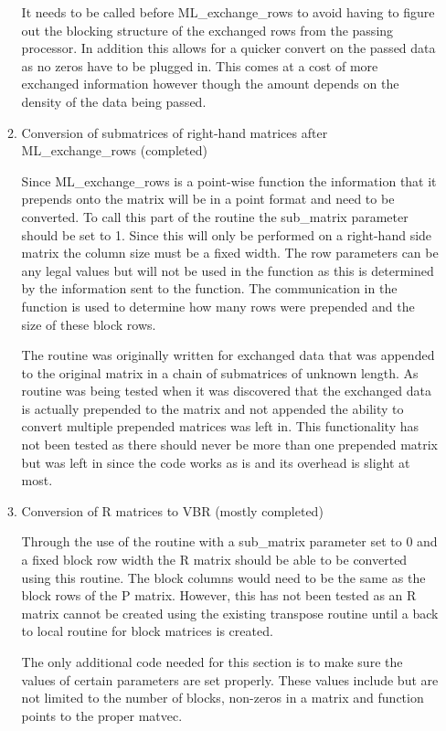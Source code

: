 \documentclass[10pt,letter,relax]{SANDreport}
\begin{document}
\begin{enumerate}
\begin{enumerate}
It needs to be called before ML\_exchange\_rows to avoid having to figure out the blocking structure of the exchanged rows from the passing processor.  In addition this allows for a quicker convert on the passed data as no zeros have to be plugged in.  This comes at a cost of more exchanged information however though the amount depends on the density of the data being passed.

      \item  Conversion of submatrices of right-hand matrices after ML\_exchange\_rows (completed)

       Since ML\_exchange\_rows is a point-wise function the information that it prepends onto the matrix will be in a point format and need to be converted.
To call this part of the routine the sub\_matrix parameter should be set to 1.  Since this will only be performed on a right-hand side matrix the column size must be a fixed width.
The row parameters can be any legal values but will not be used in the function as this is determined by the information sent to the function.
The communication in the function is used to determine how many rows were prepended and the size of these block rows.  

The routine was originally written for exchanged data that was appended to the original matrix in a chain of submatrices of unknown length.
As routine was being tested when it was discovered that the exchanged data is actually prepended to the matrix and not appended the ability to convert multiple prepended matrices was left in.
This functionality has not been tested as there should never be more than one prepended matrix but was left in since the code works as is and its overhead is slight at most.



      \item  Conversion of R matrices to VBR (mostly completed)

      Through the use of the routine with a sub\_matrix parameter set to 0 and a fixed block row width the R matrix should be able to be converted using this routine.
The block columns would need to be the same as the block rows of the P matrix.
However, this has not been tested as an R matrix cannot be created using the existing transpose routine until a back to local routine for block matrices is created.

The only additional code needed for this section is to make sure the values of certain parameters are set properly.  These values include but are not limited to the number of blocks, non-zeros in a matrix and function points to the proper matvec.
 

\end{enumerate}
\end{enumerate}
\end{document}
